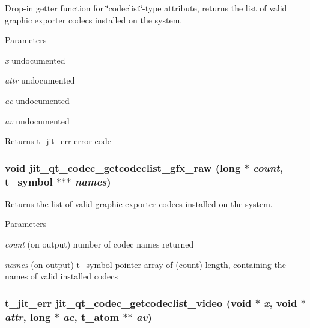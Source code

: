 Drop-\/in getter function for \char`\"{}codeclist\char`\"{}-\/type attribute, returns the list of valid graphic exporter codecs installed on the system. 
\begin{DoxyParams}{Parameters}
\item[{\em x}]undocumented \item[{\em attr}]undocumented \item[{\em ac}]undocumented \item[{\em av}]undocumented\end{DoxyParams}
\begin{DoxyReturn}{Returns}
t\_\-jit\_\-err error code 
\end{DoxyReturn}
\hypertarget{group__qtcodecmod_gacb8c32eb74355bf583e9371479531ad5}{
\subsubsection[{jit\_\-qt\_\-codec\_\-getcodeclist\_\-gfx\_\-raw}]{\setlength{\rightskip}{0pt plus 5cm}void jit\_\-qt\_\-codec\_\-getcodeclist\_\-gfx\_\-raw (long $\ast$ {\em count}, \/  {\bf t\_\-symbol} $\ast$$\ast$$\ast$ {\em names})}}
\label{group__qtcodecmod_gacb8c32eb74355bf583e9371479531ad5}


Returns the list of valid graphic exporter codecs installed on the system. 
\begin{DoxyParams}{Parameters}
\item[{\em count}](on output) number of codec names returned \item[{\em names}](on output) \hyperlink{structt__symbol}{t\_\-symbol} pointer array of (count) length, containing the names of valid installed codecs \end{DoxyParams}
\hypertarget{group__qtcodecmod_ga1a1524685c2ed9532370cdef0eb4b89d}{
\subsubsection[{jit\_\-qt\_\-codec\_\-getcodeclist\_\-video}]{\setlength{\rightskip}{0pt plus 5cm}t\_\-jit\_\-err jit\_\-qt\_\-codec\_\-getcodeclist\_\-video (void $\ast$ {\em x}, \/  void $\ast$ {\em attr}, \/  long $\ast$ {\em ac}, \/  {\bf t\_\-atom} $\ast$$\ast$ {\em av})}}
\label{group__qtcodecmod_ga1a1524685c2ed9532370cdef0eb4b89d}


